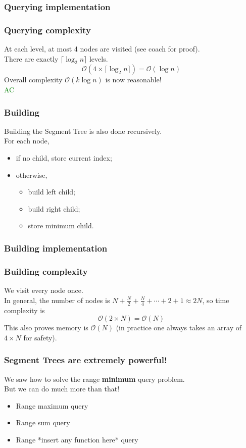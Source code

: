 \documentclass[12pt]{beamer}
\newcommand{\bigoh}{\mathcal{O}}
\begin{document}
\begin{frame}
    \frametitle{Querying implementation}

    
\end{frame}

\begin{frame}
    \frametitle{Querying complexity}

    At each level, at most 4 nodes are visited (see coach for proof). \\
    There are exactly $\lceil \log_2 n \rceil$ levels.
    \[
        \bigoh(4\times \lceil \log_2 n \rceil) = \bigoh(\log n)
    \]
    Overall complexity $\bigoh(k \log n)$ is now reasonable! \\
    \textcolor{green}{AC}
\end{frame}

\begin{frame}
    \frametitle{Building}
    Building the Segment Tree is also done recursively. \\
    For each node,
    \begin{itemize}
        \item if no child, store current index;
        \item otherwise,
            \begin{itemize}
                \item build left child;
                \item build right child;
                \item store minimum child.
            \end{itemize}
    \end{itemize}
\end{frame}

\begin{frame}
    \frametitle{Building implementation}
    
\end{frame}

\begin{frame}
    \frametitle{Building complexity}
    We visit every node once. \\
    In general, the number of nodes is $ N + \frac{N}{2} + \frac{N}{4} + \cdots + 2 + 1 \approx 2N $, so time complexity is
    \[ \bigoh(2\times N) = \bigoh(N) \]
    This also proves memory is $ \bigoh(N) $ (in practice one always takes an array of $4\times N$ for safety).
\end{frame}

\begin{frame}
    \frametitle{Segment Trees are extremely powerful!}
    We saw how to solve the range \textbf{minimum} query problem.\\
    But we can do much more than that! \\
    \begin{itemize}
        \item Range maximum query 
        \item Range sum query 
        \item Range *insert any function here* query
    \end{itemize}
\end{frame}
\end{document}
